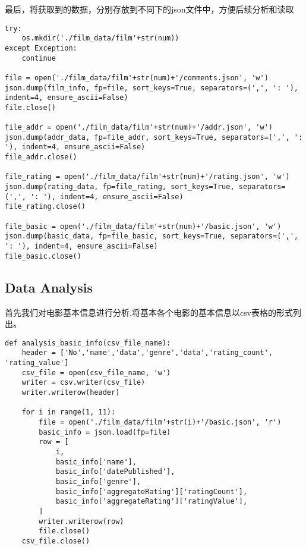\documentclass[12pt]{article}
\begin{document}
最后，将获取到的数据，分别存放到不同下的json文件中，方便后续分析和读取
\lstset{language=Python}
\begin{lstlisting}
try:
    os.mkdir('./film_data/film'+str(num))
except Exception:
    continue

file = open('./film_data/film'+str(num)+'/comments.json', 'w')
json.dump(film_info, fp=file, sort_keys=True, separators=(',', ': '), indent=4, ensure_ascii=False)
file.close()

file_addr = open('./film_data/film'+str(num)+'/addr.json', 'w')
json.dump(addr_data, fp=file_addr, sort_keys=True, separators=(',', ': '), indent=4, ensure_ascii=False)
file_addr.close()

file_rating = open('./film_data/film'+str(num)+'/rating.json', 'w')
json.dump(rating_data, fp=file_rating, sort_keys=True, separators=(',', ': '), indent=4, ensure_ascii=False)
file_rating.close()

file_basic = open('./film_data/film'+str(num)+'/basic.json', 'w')
json.dump(basic_data, fp=file_basic, sort_keys=True, separators=(',', ': '), indent=4, ensure_ascii=False)
file_basic.close()
\end{lstlisting}

\subsection{Data Analysis}
首先我们对电影基本信息进行分析,将基本各个电影的基本信息以csv表格的形式列出。
\lstset{language=Python}
\begin{lstlisting}
def analysis_basic_info(csv_file_name):
    header = ['No','name','data','genre','data','rating_count', 'rating_value']
    csv_file = open(csv_file_name, 'w')
    writer = csv.writer(csv_file)
    writer.writerow(header)

    for i in range(1, 11):
        file = open('./film_data/film'+str(i)+'/basic.json', 'r')
        basic_info = json.load(fp=file)
        row = [
            i,
            basic_info['name'],
            basic_info['datePublished'],
            basic_info['genre'],
            basic_info['aggregateRating']['ratingCount'],
            basic_info['aggregateRating']['ratingValue'],
        ]
        writer.writerow(row)
        file.close()
    csv_file.close()
\end{lstlisting}
\end{document}
